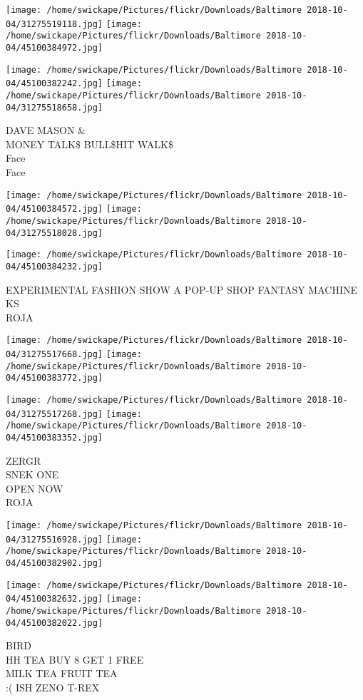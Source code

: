 \documentclass[10pt,letterpaper]{article}
\begin{document}
\texttt{[image: /home/swickape/Pictures/flickr/Downloads/Baltimore 2018-10-04/31275519118.jpg]}
\texttt{[image: /home/swickape/Pictures/flickr/Downloads/Baltimore 2018-10-04/45100384972.jpg]}

\texttt{[image: /home/swickape/Pictures/flickr/Downloads/Baltimore 2018-10-04/45100382242.jpg]}
\texttt{[image: /home/swickape/Pictures/flickr/Downloads/Baltimore 2018-10-04/31275518658.jpg]}

DAVE MASON \&\\
MONEY TALK\$ BULL\$HIT WALK\$\\
Face\\
Face\\
\pagebreak

\texttt{[image: /home/swickape/Pictures/flickr/Downloads/Baltimore 2018-10-04/45100384572.jpg]}
\texttt{[image: /home/swickape/Pictures/flickr/Downloads/Baltimore 2018-10-04/31275518028.jpg]}

\vspace{0.25in}
\texttt{[image: /home/swickape/Pictures/flickr/Downloads/Baltimore 2018-10-04/45100384232.jpg]}

EXPERIMENTAL FASHION SHOW A POP{-}UP SHOP FANTASY MACHINE\\
KS\\
ROJA\\
\pagebreak

\texttt{[image: /home/swickape/Pictures/flickr/Downloads/Baltimore 2018-10-04/31275517668.jpg]}
\texttt{[image: /home/swickape/Pictures/flickr/Downloads/Baltimore 2018-10-04/45100383772.jpg]}

\texttt{[image: /home/swickape/Pictures/flickr/Downloads/Baltimore 2018-10-04/31275517268.jpg]}
\texttt{[image: /home/swickape/Pictures/flickr/Downloads/Baltimore 2018-10-04/45100383352.jpg]}

ZERGR\\
SNEK ONE\\
OPEN NOW\\
ROJA\\
\pagebreak

\texttt{[image: /home/swickape/Pictures/flickr/Downloads/Baltimore 2018-10-04/31275516928.jpg]}
\texttt{[image: /home/swickape/Pictures/flickr/Downloads/Baltimore 2018-10-04/45100382902.jpg]}

\texttt{[image: /home/swickape/Pictures/flickr/Downloads/Baltimore 2018-10-04/45100382632.jpg]}
\texttt{[image: /home/swickape/Pictures/flickr/Downloads/Baltimore 2018-10-04/45100382022.jpg]}

BIRD\\
HH TEA BUY 8 GET 1 FREE\\
MILK TEA FRUIT TEA\\
:( ISH ZENO T{-}REX\\
\pagebreak
\end{document}
